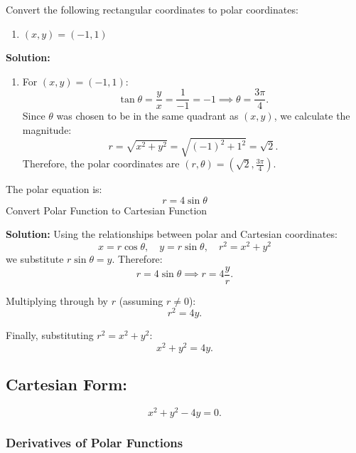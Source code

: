 \documentclass[12pt]{article}
\theoremstyle{beautifulthm}
\begin{document}
\begin{tcolorbox}[colback=examplebg, colframe=red!75!black, title=\textbf{EXAMPLE 2: Rectangular-to-Polar Conversion}, fonttitle=\bfseries, sharp corners]

Convert the following rectangular coordinates to polar coordinates:
\begin{enumerate}
    \item \( (x, y) = (-1, 1) \)
\end{enumerate}

\tcblower
\textbf{Solution:} 
\begin{enumerate}
    \item For \( (x, y) = (-1, 1) \):
    \[
    \tan \theta = \frac{y}{x} = \frac{1}{-1} = -1 \implies \theta = \frac{3\pi}{4}.
    \]
    Since \( \theta \) was chosen to be in the same quadrant as \( (x, y) \), we calculate the magnitude:
    \[
    r = \sqrt{x^2 + y^2} = \sqrt{(-1)^2 + 1^2} = \sqrt{2}.
    \]
    Therefore, the polar coordinates are \( (r, \theta) = \left(\sqrt{2}, \frac{3\pi}{4}\right) \).
\end{enumerate}
\end{tcolorbox}

\begin{tcolorbox}[colback=examplebg, colframe=red!75!black, title=\textbf{EXAMPLE 3: Convert Polar Function to Cartesian Function}, fonttitle=\bfseries, sharp corners]
The polar equation is:
\[
r = 4 \sin \theta
\]
Convert Polar Function to Cartesian Function


\tcblower
\textbf{Solution:} 
Using the relationships between polar and Cartesian coordinates:
\[
x = r \cos \theta, \quad y = r \sin \theta, \quad r^2 = x^2 + y^2
\]
we substitute \( r \sin \theta = y \). Therefore:
\[
r = 4 \sin \theta \implies r = 4 \frac{y}{r}.
\]

Multiplying through by \( r \) (assuming \( r \neq 0 \)):
\[
r^2 = 4y.
\]

Finally, substituting \( r^2 = x^2 + y^2 \):
\[
x^2 + y^2 = 4y.
\]

\subsection*{Cartesian Form:}
\[
x^2 + y^2 - 4y = 0.
\]
\end{tcolorbox}


\subsubsection{Derivatives of Polar Functions}
\end{document}
